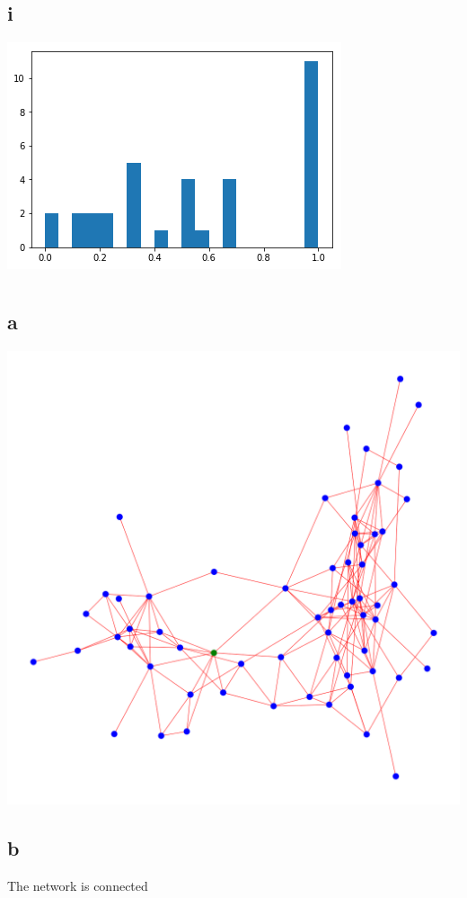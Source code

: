 \documentclass[12pt]{article}
\begin{document}
\subsection*{i}\includegraphics[scale = 0.7]{5.png}
\pagebreak


\section{}
\subsection*{a}
\includegraphics[width=\textwidth]{11.png}
\pagebreak
\subsection*{b} The network is connected
\end{document}
